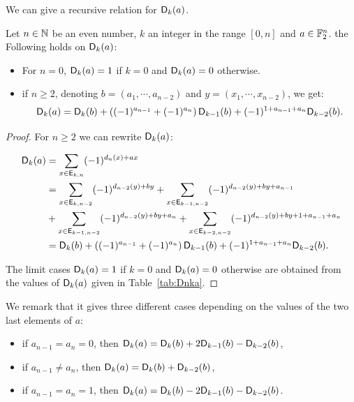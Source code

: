 \documentclass[11pt]{llncs}
\begin{document}
We can give a recursive relation for $\Dnka{n}{k}{a}$.




\begin{proposition}\label{prop:recursiveDnka}
Let $n\in \N$ be an even number, $k$ an integer in the range $[0,n]$ and $a\in \F_2^n$. the Following holds on $\Dnka{n}{k}{a}$:
\begin{itemize}
	\item For $n=0$, $\Dnka{0}{k}{a}=1$ if $k=0$ and $\Dnka 0ka=0$ otherwise.
	\item if $n\ge 2$, denoting  $b=(a_1,\cdots,a_{n-2})$ and $y=(x_1,\cdots,x_{n-2})$, we get:
	\[\Dnka{n}{k}{a}=\Dnka{n-2}{k}{b}+\left((-1)^{a_{n-1}} + (-1)^{a_{n}}\right)\Dnka{n-2}{k-1}{b} + (-1)^{1+a_{n-1}+a_n} \Dnka{n-2}{k-2}{b}.\]
\end{itemize}

	
\end{proposition}

\begin{proof}
For $n\ge 2$ we can rewrite $\Dnka{n}{k}{a}$:

\begin{align*}
\Dnka{n}{k}{a}&=\sum_{x\in \Ekn{k}{n}} (-1)^{d_n(x) +a x}\\
&=\sum_{x\in \Ekn{k}{n-2}} (-1)^{d_{n-2}(y) +b y}+
\sum_{x\in \Ekn{k-1}{n-2}} (-1)^{d_{n-2}(y) +b y + a_{n-1}}\\
&+\sum_{x\in \Ekn{k-1}{n-2}} (-1)^{d_{n-2}(y) +b y + a_{n}}
+\sum_{x\in \Ekn{k-2}{n-2}} (-1)^{d_{n-2}(y) +b y +1 + a_{n-1}+ a_{n}}\\
&=\Dnka{n-2}{k}{b}+\left((-1)^{a_{n-1}} + (-1)^{a_{n}}\right)\Dnka{n-2}{k-1}{b} + (-1)^{1+a_{n-1}+a_n} \Dnka{n-2}{k-2}{b}.
\end{align*}



The limit cases $\Dnka 0ka=1$ if $k=0$ and $\Dnka 0ka=0$ otherwise are obtained from the values of $\Dnka{2}{k}{a}$ given in Table~\ref{tab:Dnka}.
\end{proof}








We remark that it gives three different cases depending on the values of the two last elements of $a$:%
\begin{itemize}
	\item if $a_{n-1}=a_n=0$, then $\Dnka{n}{k}{a}=\Dnka{n}{k}{b}+2\Dnka{n}{k-1}{b}-\Dnka{n}{k-2}{b}$,
	\item if $a_{n-1} \ne a_n$, then $\Dnka{n}{k}{a}=\Dnka{n}{k}{b}+\Dnka{n}{k-2}{b}$,
	\item if $a_{n-1}=a_n=1$, then $\Dnka{n}{k}{a}=\Dnka{n}{k}{b}-2\Dnka{n}{k-1}{b}-\Dnka{n}{k-2}{b}$.
\end{itemize}
\end{document}
